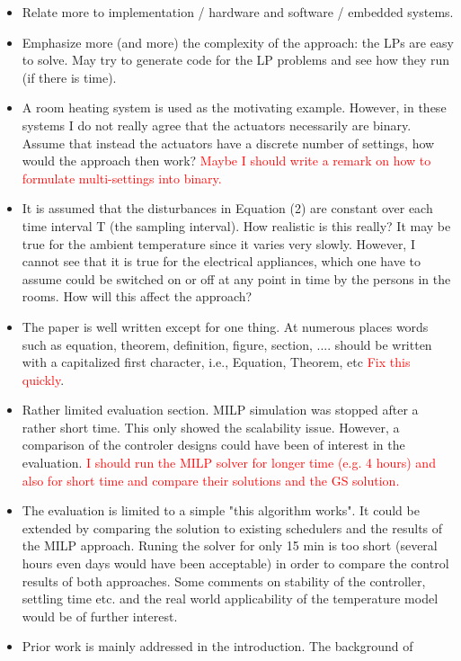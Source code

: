 \documentclass{sig-alternate}
\begin{document}
\begin{itemize}
\item Relate more to implementation / hardware and software / embedded systems.
\item Emphasize more (and more) the complexity of the approach: the LPs are easy to solve. May try to generate code for the LP problems and see how they run (if there is time).
\item A room heating system is used as the motivating example. However, in these
systems I do not really agree that the actuators necessarily are binary. Assume
that instead the actuators have a discrete number of settings, how would the
approach then work? \textcolor{red}{Maybe I should write a remark on how to formulate multi-settings into binary.}
\item It is assumed that the disturbances in Equation (2) are constant over each time
interval T (the sampling interval). How realistic is this really? It may be
true for the ambient temperature since it varies very slowly. However, I cannot
see that it is true for the electrical appliances, which one have to assume
could be switched on or off at any point in time by the persons in the rooms.
How will this affect the approach?
\item The paper is well written except for one thing. At numerous places words such
as equation, theorem, definition, figure, section, .... should be written with
a capitalized first character, i.e., Equation, Theorem, etc  \textcolor{red}{Fix this quickly}.
\item Rather limited evaluation section. MILP simulation was stopped after a 
rather short time. This only showed the scalability issue. However, a 
comparison of the controler designs could have been of interest in the 
evaluation. \textcolor{red}{I should run the MILP solver for longer time (e.g. 4 hours) and also for short time and compare their solutions and the GS solution.}
\item The evaluation is limited to a simple "this algorithm works". It could be 
extended by comparing the solution to existing schedulers and the results 
of the MILP approach. Runing the solver for only 15 min is too short (several 
hours even days would have been acceptable) in order to compare the control 
results of both approaches. Some comments on stability of the controller, 
settling time etc. and the real world applicability of the temperature model 
would be of further interest.
\item Prior work is mainly addressed in the introduction. The background of

\end{itemize}
\end{document}
